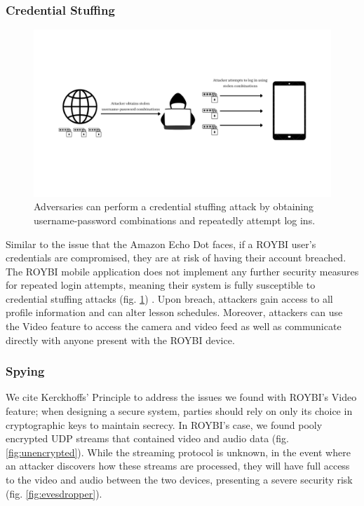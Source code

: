 \documentclass[12pt]{ucthesis}
\begin{document}
\subsubsection{Credential Stuffing}
\begin{figure}
    \includegraphics[width=\textwidth]{stuffing.jpg}
    \caption{Adversaries can perform a credential stuffing attack by obtaining username-password combinations and repeatedly attempt log ins.}
    \label{fig:stuffing}
\end{figure}

Similar to the issue that the Amazon Echo Dot faces, if a ROYBI user's credentials are compromised, they are at risk of having their account breached. The ROYBI mobile application does not implement any further security measures for repeated login attempts, meaning their system is fully susceptible to credential stuffing attacks (fig. \ref{fig:stuffing}) \cite{stuffing}. Upon breach, attackers gain access to all profile information and can alter lesson schedules. Moreover, attackers can use the Video feature to access the camera and video feed as well as communicate directly with anyone present with the ROYBI device.

\subsubsection{Spying}
We cite Kerckhoffs' Principle \cite{kerckhoffs} to address the issues we found with ROYBI's Video feature; when designing a secure system, parties should rely on only its choice in cryptographic keys to maintain secrecy. In ROYBI's case, we found pooly encrypted UDP streams that contained video and audio data (fig. \ref{fig:unencrypted}). While the streaming protocol is unknown, in the event where an attacker discovers how these streams are processed, they will have full access to the video and audio between the two devices, presenting a severe security risk (fig. \ref{fig:evesdropper}).
\end{document}
